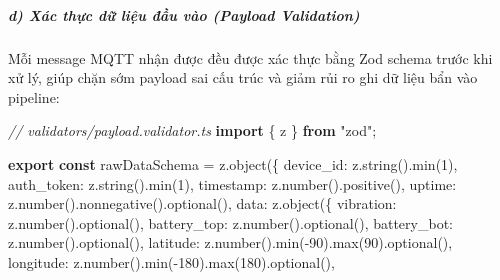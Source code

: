 \documentclass[13pt,a4paper]{extarticle}
\newenvironment{Shaded}{}{}
\newcommand{\CommentTok}[1]{\textcolor[rgb]{0.38,0.63,0.69}{\textit{#1}}}
\newcommand{\DecValTok}[1]{\textcolor[rgb]{0.25,0.63,0.44}{#1}}
\newcommand{\FunctionTok}[1]{\textcolor[rgb]{0.02,0.16,0.49}{#1}}
\newcommand{\ImportTok}[1]{\textcolor[rgb]{0.00,0.50,0.00}{\textbf{#1}}}
\newcommand{\KeywordTok}[1]{\textcolor[rgb]{0.00,0.44,0.13}{\textbf{#1}}}
\newcommand{\NormalTok}[1]{#1}
\newcommand{\OperatorTok}[1]{\textcolor[rgb]{0.40,0.40,0.40}{#1}}
\newcommand{\StringTok}[1]{\textcolor[rgb]{0.25,0.44,0.63}{#1}}
\renewcommand{\\}{\thesislongtableorignewline\hline}%
\begin{document}
\subparagraph{d) Xác thực dữ liệu đầu vào (Payload
Validation)}\label{d-xuxe1c-thux1ef1c-dux1eef-liux1ec7u-ux111ux1ea7u-vuxe0o-payload-validation}

Mỗi message MQTT nhận được đều được xác thực bằng Zod schema trước khi
xử lý, giúp chặn sớm payload sai cấu trúc và giảm rủi ro ghi dữ liệu bẩn
vào pipeline:

\begin{Shaded}
\begin{Highlighting}[]
\CommentTok{// validators/payload.validator.ts}
\ImportTok{import}\NormalTok{ \{ z \} }\ImportTok{from} \StringTok{"zod"}\OperatorTok{;}

\ImportTok{export} \KeywordTok{const}\NormalTok{ rawDataSchema }\OperatorTok{=}\NormalTok{ z}\OperatorTok{.}\FunctionTok{object}\NormalTok{(\{}
\NormalTok{  device\_id}\OperatorTok{:}\NormalTok{ z}\OperatorTok{.}\FunctionTok{string}\NormalTok{()}\OperatorTok{.}\FunctionTok{min}\NormalTok{(}\DecValTok{1}\NormalTok{)}\OperatorTok{,}
\NormalTok{  auth\_token}\OperatorTok{:}\NormalTok{ z}\OperatorTok{.}\FunctionTok{string}\NormalTok{()}\OperatorTok{.}\FunctionTok{min}\NormalTok{(}\DecValTok{1}\NormalTok{)}\OperatorTok{,}
\NormalTok{  timestamp}\OperatorTok{:}\NormalTok{ z}\OperatorTok{.}\FunctionTok{number}\NormalTok{()}\OperatorTok{.}\FunctionTok{positive}\NormalTok{()}\OperatorTok{,}
\NormalTok{  uptime}\OperatorTok{:}\NormalTok{ z}\OperatorTok{.}\FunctionTok{number}\NormalTok{()}\OperatorTok{.}\FunctionTok{nonnegative}\NormalTok{()}\OperatorTok{.}\FunctionTok{optional}\NormalTok{()}\OperatorTok{,}
\NormalTok{  data}\OperatorTok{:}\NormalTok{ z}\OperatorTok{.}\FunctionTok{object}\NormalTok{(\{}
\NormalTok{    vibration}\OperatorTok{:}\NormalTok{ z}\OperatorTok{.}\FunctionTok{number}\NormalTok{()}\OperatorTok{.}\FunctionTok{optional}\NormalTok{()}\OperatorTok{,}
\NormalTok{    battery\_top}\OperatorTok{:}\NormalTok{ z}\OperatorTok{.}\FunctionTok{number}\NormalTok{()}\OperatorTok{.}\FunctionTok{optional}\NormalTok{()}\OperatorTok{,}
\NormalTok{    battery\_bot}\OperatorTok{:}\NormalTok{ z}\OperatorTok{.}\FunctionTok{number}\NormalTok{()}\OperatorTok{.}\FunctionTok{optional}\NormalTok{()}\OperatorTok{,}
\NormalTok{    latitude}\OperatorTok{:}\NormalTok{ z}\OperatorTok{.}\FunctionTok{number}\NormalTok{()}\OperatorTok{.}\FunctionTok{min}\NormalTok{(}\OperatorTok{{-}}\DecValTok{90}\NormalTok{)}\OperatorTok{.}\FunctionTok{max}\NormalTok{(}\DecValTok{90}\NormalTok{)}\OperatorTok{.}\FunctionTok{optional}\NormalTok{()}\OperatorTok{,}
\NormalTok{    longitude}\OperatorTok{:}\NormalTok{ z}\OperatorTok{.}\FunctionTok{number}\NormalTok{()}\OperatorTok{.}\FunctionTok{min}\NormalTok{(}\OperatorTok{{-}}\DecValTok{180}\NormalTok{)}\OperatorTok{.}\FunctionTok{max}\NormalTok{(}\DecValTok{180}\NormalTok{)}\OperatorTok{.}\FunctionTok{optional}\NormalTok{()}\OperatorTok{,}

\end{Highlighting}
\end{Shaded}
\end{document}
